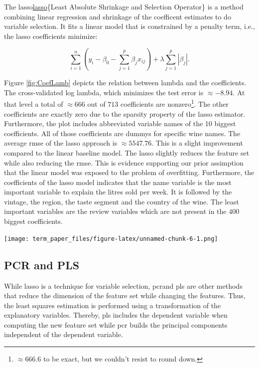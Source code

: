 \documentclass[11pt,]{article}
\let\origfigure\figure
\let\endorigfigure\endfigure
\renewenvironment{figure}[1][2] {
    \expandafter\origfigure\expandafter[H]
} {
    \endorigfigure
}
\let\rmarkdownfootnote\footnote%
\def\footnote{\protect\rmarkdownfootnote}
\begin{document}
The \ac{lasso}\protect\hyperlink{lasso}{lasso}\{Least Absolute Shrinkage
and Selection Operator\} is a method combining linear regression and
shrinkage of the coefficent estimates to do variable selection. It fits
a linear model that is constrained by a penalty term, i.e., the
\ac{lasso} coefficients minimize:

\[
\sum_{i=1}^{n}(y_i - \beta_0 - \sum_{j=1}^{p}\beta_jx_{ij})+\lambda\sum_{j=1}^{p}|\beta_j|.
\]

Figure \ref{fig:CoefLamb} depicts the relation between lambda and the
coefficients. The cross-validated log lambda, which minimizes the test
error is \(\approx -8.94\). At that level a total of \(\approx 666\) out
of \(713\) coefficients are
nonzero\footnote{$\approx 666.6$ to be exact, but we couldn't resist to round down.}.
The other coefficients are exactly zero due to the sparsity property of
the \ac{lasso} estimator. Furthermore, the plot includes abbreviated
variable names of the 10 biggest coefficients. All of those coefficients
are dummys for specific wine names. The average \ac{rmse} of the
\ac{lasso} approach is \(\approx 5547.76\). This is a slight improvement
compared to the linear baseline model. The \ac{lasso} slightly reduces
the feature set while also reducing the \ac{rmse}. This is evidence
supporting our prior assimption that the linear model was exposed to the
problem of overfitting. Furthermore, the coefficients of the \ac{lasso}
model indicates that the name variable is the most important variable to
explain the litres sold per week. It is followed by the vintage, the
region, the taste segment and the country of the wine. The least
important variables are the review variables which are not present in
the \(400\) biggest coefficients.

\begin{figure}
\centering
\texttt{[image: term\_paper\_files/figure-latex/unnamed-chunk-6-1.png]}
\caption{\label{fig:CoefLamb}Relation of Coefficients and Shrinkage.}
\end{figure}

\hypertarget{pcr-and-pls}{%
\subsection{PCR and PLS}\label{pcr-and-pls}}

While \ac{lasso} is a technique for variable selection, \ac{pcr}and
\ac{pls} are other methods that reduce the dimension of the feature set
while changing the features. Thus, the least squares estimation is
performed using a transformation of the explanatory variables. Thereby,
\ac{pls} includes the dependent variable when computing the new feature
set while \ac{pcr} builds the principal components independent of the
dependent variable.
\end{document}
